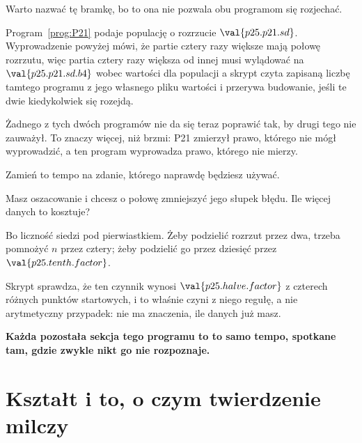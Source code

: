 \begin{fr}
Warto nazwać tę bramkę, bo to ona nie pozwala obu programom się rozjechać.

Program~\ref{prog:P21} podaje populację o rozrzucie $\val{p25.p21.sd}$.
Wyprowadzenie powyżej mówi, że partie cztery razy większe mają połowę
rozrzutu, więc partia cztery razy większa od innej musi wylądować na
$\val{p25.p21.sd.b4}$ wobec wartości dla populacji \dash{} a skrypt czyta
zapisaną liczbę tamtego programu z jego własnego pliku wartości i przerywa
budowanie, jeśli te dwie kiedykolwiek się rozejdą.

Żadnego z tych dwóch programów nie da się teraz poprawić tak, by drugi tego
nie zauważył. To znaczy więcej, niż brzmi: P21 zmierzył prawo, którego nie
mógł wyprowadzić, a ten program wyprowadza prawo, którego nie mierzy.
\end{fr}

\begin{fr}
Zamień to tempo na zdanie, którego naprawdę będziesz używać.

Masz oszacowanie i chcesz o połowę zmniejszyć jego słupek błędu. Ile więcej
danych to kosztuje?
\dotline
\nextframe
\end{fr}

\begin{fr}

Bo liczność siedzi pod pierwiastkiem. Żeby podzielić rozrzut przez dwa,
trzeba pomnożyć $n$ przez cztery; żeby podzielić go przez dziesięć \dash{}
przez $\val{p25.tenth.factor}$.

Skrypt sprawdza, że ten czynnik wynosi $\val{p25.halve.factor}$ z czterech
różnych punktów startowych, i to właśnie czyni z niego regułę, a nie
arytmetyczny przypadek: nie ma znaczenia, ile danych już masz.

\textbf{Każda pozostała sekcja tego programu to to samo tempo, spotkane tam,
gdzie zwykle nikt go nie rozpoznaje.}
\end{fr}

\section{Kształt i to, o czym twierdzenie milczy}
\label{sec:P25-clt}

